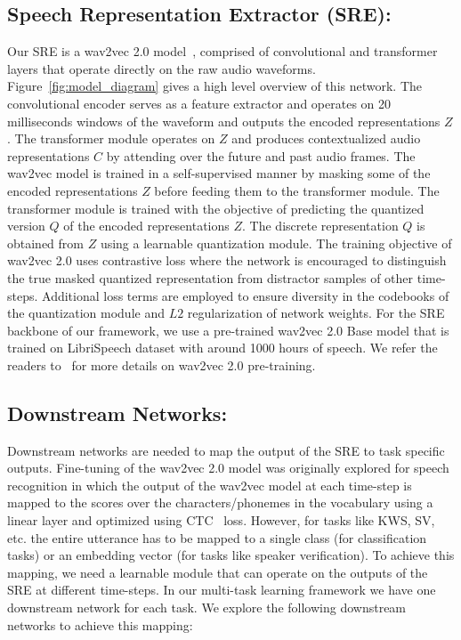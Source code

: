 \documentclass{article}
\begin{document}
\subsection{Speech Representation Extractor (SRE):}
Our SRE is a wav2vec 2.0 model~\cite{wav2vec2}, comprised of convolutional and transformer layers that operate directly on the raw audio waveforms. Figure~\ref{fig:model_diagram} gives a high level overview of this network. The convolutional encoder serves as a feature extractor and operates on 20 milliseconds windows of the waveform and outputs the encoded representations $\mathit{Z}$. The transformer module operates on $Z$ and produces contextualized audio representations $C$ by attending over the future and past audio frames. 
The wav2vec model is trained in a self-supervised manner by masking some of the encoded representations $Z$ before feeding them to the transformer module. The transformer module is trained with the objective of predicting the quantized version $Q$ of the encoded representations $Z$. The discrete representation $Q$ is obtained from $Z$ using a learnable quantization module. The training objective of wav2vec 2.0 uses contrastive loss where the network is encouraged to distinguish the true masked quantized representation from distractor samples of other time-steps. Additional loss terms are employed to ensure diversity in the codebooks of the quantization module and $L2$ regularization of network weights.  
For the SRE backbone of our framework, we use a pre-trained wav2vec 2.0 Base model that is trained on LibriSpeech dataset with around 1000 hours of speech. We refer the readers to~\cite{wav2vec2} for more details on wav2vec 2.0 pre-training. 


\vspace{-3mm}
\subsection{Downstream Networks:}
Downstream networks are needed to map the output of the SRE to task specific outputs. Fine-tuning of the wav2vec 2.0 model was originally explored for speech recognition in which the output of the wav2vec model at each time-step is mapped to the scores over the characters/phonemes in the vocabulary using a linear layer and optimized using CTC~\cite{graves2006connectionist} loss. 
However, for tasks like KWS, SV, etc. the entire utterance has to be mapped to a single class (for classification tasks) or an embedding vector (for tasks like speaker verification). To achieve this mapping, we need a learnable module that can operate on the outputs of the SRE at different time-steps. 
In our multi-task learning framework we have one downstream network for each task.
We explore the following downstream networks to achieve this mapping:
\end{document}
